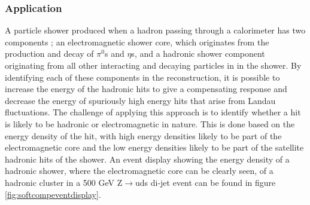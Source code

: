 \subsubsection{Application}
A particle shower produced when a hadron passing through a calorimeter has two components \cite{Wigmans:2000vf}; an electromagnetic shower core, which originates from the production and decay of $\pi^{0}$s and $\eta$s, and a hadronic shower component originating from all other interacting and decaying particles in in the shower.  By identifying each of these components in the reconstruction, it is possible to increase the energy of the hadronic hits to give a compensating response and decrease the energy of spuriously high energy hits that arise from Landau fluctuations.  The challenge of applying this approach is to identify whether a hit is likely to be hadronic or electromagnetic in nature.  This is done based on the energy density of the hit, with high energy densities likely to be part of the electromagnetic core and the low energy densities likely to be part of the satellite hadronic hits of the shower.  An event display showing the energy density of a hadronic shower, where the electromagnetic core can be clearly seen, of a hadronic cluster in a 500 GeV Z$\rightarrow$uds di-jet event can be found in figure \ref{fig:softcompeventdisplay}.  

